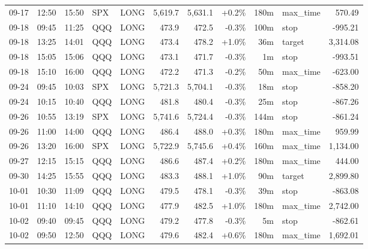 \documentclass[11pt,a4paper,twoside]{article}
\begin{document}
\begin{center}
\begin{longtable}{>{\color{txtmain}}l l l l l r r r r >{\color{txtmain}}l r}
09-17 & 12:50 & 15:50 & SPX & LONG & 5,619.7 & 5,631.1 & \textcolor{wingreen}{+0.2\%} & 180m & max\_time & \textcolor{wingreen}{570.49} \\
09-18 & 09:45 & 11:25 & QQQ & LONG & 473.9 & 472.5 & \textcolor{lossred}{-0.3\%} & 100m & stop & \textcolor{lossred}{-995.21} \\
09-18 & 13:25 & 14:01 & QQQ & LONG & 473.4 & 478.2 & \textcolor{wingreen}{+1.0\%} & 36m & target & \textcolor{wingreen}{3,314.08} \\
09-18 & 15:05 & 15:06 & QQQ & LONG & 473.1 & 471.7 & \textcolor{lossred}{-0.3\%} & 1m & stop & \textcolor{lossred}{-993.51} \\
09-18 & 15:10 & 16:00 & QQQ & LONG & 472.2 & 471.3 & \textcolor{lossred}{-0.2\%} & 50m & max\_time & \textcolor{lossred}{-623.00} \\
09-24 & 09:45 & 10:03 & SPX & LONG & 5,721.3 & 5,704.1 & \textcolor{lossred}{-0.3\%} & 18m & stop & \textcolor{lossred}{-858.20} \\
09-24 & 10:15 & 10:40 & QQQ & LONG & 481.8 & 480.4 & \textcolor{lossred}{-0.3\%} & 25m & stop & \textcolor{lossred}{-867.26} \\
09-26 & 10:55 & 13:19 & SPX & LONG & 5,741.6 & 5,724.4 & \textcolor{lossred}{-0.3\%} & 144m & stop & \textcolor{lossred}{-861.24} \\
09-26 & 11:00 & 14:00 & QQQ & LONG & 486.4 & 488.0 & \textcolor{wingreen}{+0.3\%} & 180m & max\_time & \textcolor{wingreen}{959.99} \\
09-26 & 13:20 & 16:00 & SPX & LONG & 5,722.9 & 5,745.6 & \textcolor{wingreen}{+0.4\%} & 160m & max\_time & \textcolor{wingreen}{1,134.00} \\
09-27 & 12:15 & 15:15 & QQQ & LONG & 486.6 & 487.4 & \textcolor{wingreen}{+0.2\%} & 180m & max\_time & \textcolor{wingreen}{444.00} \\
09-30 & 14:25 & 15:55 & QQQ & LONG & 483.3 & 488.1 & \textcolor{wingreen}{+1.0\%} & 90m & target & \textcolor{wingreen}{2,899.80} \\
10-01 & 10:30 & 11:09 & QQQ & LONG & 479.5 & 478.1 & \textcolor{lossred}{-0.3\%} & 39m & stop & \textcolor{lossred}{-863.08} \\
10-01 & 11:10 & 14:10 & QQQ & LONG & 477.9 & 482.5 & \textcolor{wingreen}{+1.0\%} & 180m & max\_time & \textcolor{wingreen}{2,742.00} \\
10-02 & 09:40 & 09:45 & QQQ & LONG & 479.2 & 477.8 & \textcolor{lossred}{-0.3\%} & 5m & stop & \textcolor{lossred}{-862.61} \\
10-02 & 09:50 & 12:50 & QQQ & LONG & 479.6 & 482.4 & \textcolor{wingreen}{+0.6\%} & 180m & max\_time & \textcolor{wingreen}{1,692.01} \\

\end{longtable}
\end{center}
\end{document}
